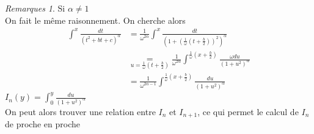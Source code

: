 \documentclass[fleqn]{article}
\theoremstyle{definition} \newtheorem*{defi}{D\'efinition}
\theoremstyle{definition} \newtheorem*{theo}{Th\'eor\`eme}
\theoremstyle{remark} \newtheorem*{rqs}{Remarques}
\theoremstyle{definition} \newtheorem*{prop}{Propri\'et\'e}
\begin{document}
\begin{rqs} Si $\alpha \neq 1$ \\
	On fait le m\^eme raisonnement. On cherche alors
	\begin{align*}
		\int^{x} \frac{dt}{(t^2 + bt + c)^{\alpha}} &= \frac{1}{\omega^{2\alpha}}\int^{x}
			\frac{dt}{(1 + (\frac{1}{\omega}(t + \frac{b}{2}))^2)^\alpha}\\
		&\underset{u = \frac{1}{\omega}(t + \frac{b}{2})}{=} \frac{1}{\omega^{2\alpha}}\int^{\frac{1}{\omega}(x + \frac{b}{2})} \frac{\omega du}
			{(1 + u^2)^\alpha} \\
		&= \frac{1}{\omega^{2\alpha -1}}\int^{\frac{1}{\omega}(x + \frac{b}{2})} \frac{du}
			{(1 + u^2)^\alpha}
	\end{align*}
$I_n(y) = \int_{0}^{y} \frac{du}{(1+u^2)^\alpha}$ \\
On peut alors trouver une relation entre $I_n$ et $I_{n+1}$, ce qui permet le calcul de $I_n$ de proche en proche
\end{rqs}
\end{document}
